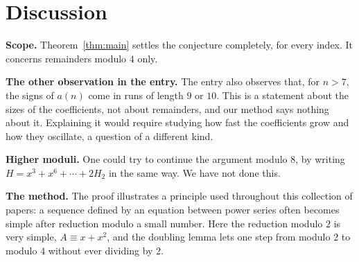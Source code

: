 \documentclass[11pt,a4paper]{article}
\theoremstyle{definition}
\theoremstyle{remark}
\newcommand{\para}[1]{\par\medskip\noindent\textbf{#1}\enspace}
\begin{document}
\section{Discussion}\label{sec:discussion}

\para{Scope.} Theorem~\ref{thm:main} settles the conjecture completely, for every index. It concerns remainders modulo
$4$ only.

\para{The other observation in the entry.} The entry also observes that, for $n>7$, the signs of $a(n)$ come in runs
of length $9$ or $10$. This is a statement about the sizes of the coefficients, not about remainders, and our method
says nothing about it. Explaining it would require studying how fast the coefficients grow and how they oscillate, a
question of a different kind.

\para{Higher moduli.} One could try to continue the argument modulo $8$, by writing $H=x^3+x^6+\cdots+2H_2$ in the same
way. We have not done this.

\para{The method.} The proof illustrates a principle used throughout this collection of papers: a sequence defined by an
equation between power series often becomes simple after reduction modulo a small number. Here the reduction modulo $2$
is very simple, $A\equiv x+x^2$, and the doubling lemma lets one step from modulo $2$ to modulo $4$ without ever
dividing by $2$.
\end{document}
